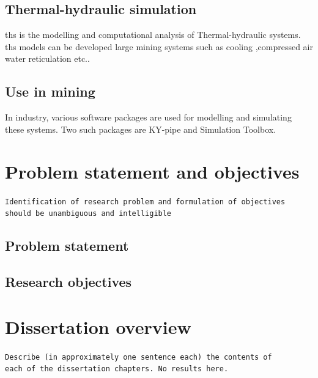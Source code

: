 \subsection{Thermal-hydraulic simulation}
\gls{ths} is the modelling and computational analysis of Thermal-hydraulic systems. \gls{ths} models can be developed large mining systems such as cooling ,compressed air water reticulation etc..\par

\subsection{Use in mining}
In industry, various software packages are used for modelling and simulating these systems. Two such packages are KY-pipe and Simulation Toolbox.

\section{Problem statement and objectives}
\texttt{Identification of research problem and formulation of objectives \\should be unambiguous and intelligible}
\subsection{Problem statement}
\subsection{Research objectives}
\section{Dissertation overview}
\texttt{Describe (in approximately one sentence each) the contents of \\each of the dissertation chapters. No results here.}